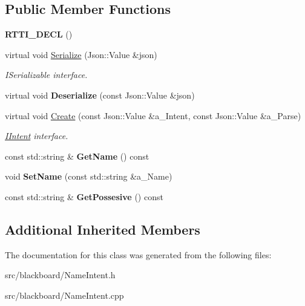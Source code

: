 \subsection*{Public Member Functions}
\begin{DoxyCompactItemize}
\item 
\mbox{\label{class_name_intent_a986c00cc1df8b4ec599b86007c7b295b}} 
{\bfseries R\+T\+T\+I\+\_\+\+D\+E\+CL} ()
\item 
\mbox{\label{class_name_intent_a60324c911fc2acd9116bd739920dddf6}} 
virtual void \hyperlink{class_name_intent_a60324c911fc2acd9116bd739920dddf6}{Serialize} (Json\+::\+Value \&json)
\begin{DoxyCompactList}\small\item\em I\+Serializable interface. \end{DoxyCompactList}\item 
\mbox{\label{class_name_intent_a33839c5f42ad872c1623ab65c7338f47}} 
virtual void {\bfseries Deserialize} (const Json\+::\+Value \&json)
\item 
\mbox{\label{class_name_intent_ae5efef9cb9301e885a4ebf39fa3572e3}} 
virtual void \hyperlink{class_name_intent_ae5efef9cb9301e885a4ebf39fa3572e3}{Create} (const Json\+::\+Value \&a\+\_\+\+Intent, const Json\+::\+Value \&a\+\_\+\+Parse)
\begin{DoxyCompactList}\small\item\em \hyperlink{class_i_intent}{I\+Intent} interface. \end{DoxyCompactList}\item 
\mbox{\label{class_name_intent_a37c82b3e2f03beae3d716271ff76600d}} 
const std\+::string \& {\bfseries Get\+Name} () const
\item 
\mbox{\label{class_name_intent_aaf9c478d16bcb1cc3a8374d4e12bbe94}} 
void {\bfseries Set\+Name} (const std\+::string \&a\+\_\+\+Name)
\item 
\mbox{\label{class_name_intent_af3af2f59b148889bbc2941defcf937ac}} 
const std\+::string \& {\bfseries Get\+Possesive} () const
\end{DoxyCompactItemize}
\subsection*{Additional Inherited Members}


The documentation for this class was generated from the following files\+:\begin{DoxyCompactItemize}
\item 
src/blackboard/Name\+Intent.\+h\item 
src/blackboard/Name\+Intent.\+cpp\end{DoxyCompactItemize}
